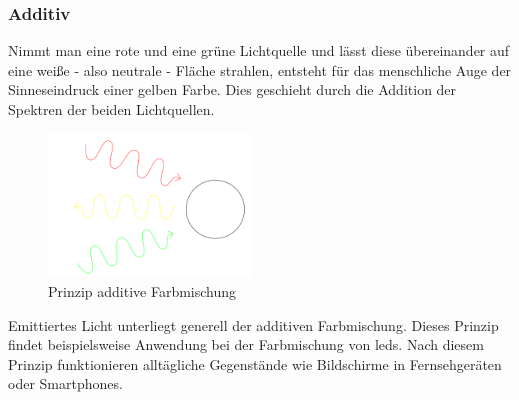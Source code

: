 \documentclass[11pt]{scrartcl}
\begin{document}
\subsubsection{Additiv}
Nimmt man eine rote und eine grüne Lichtquelle und lässt diese übereinander auf eine weiße - also neutrale - Fläche strahlen, entsteht für
das menschliche Auge der Sinneseindruck einer gelben Farbe. Dies geschieht durch die Addition der Spektren der beiden Lichtquellen.
\cite[62]{lichtquellen}\\
\begin{figure}
    \vspace{-25pt}
    \begin{center}
        \includegraphics[width=0.48\textwidth]{images/additive_color_mixing.png} %
    \end{center}
    \vspace{-20pt}
    \caption{Prinzip additive Farbmischung}
    \vspace{-15pt}
\end{figure}
Emittiertes Licht unterliegt generell der additiven Farbmischung. Dieses Prinzip findet beispielsweise Anwendung bei der Farbmischung von
\ac{led}s. Nach diesem Prinzip funktionieren alltägliche Gegenstände wie Bildschirme in Fernsehgeräten oder Smartphones.
\end{document}
